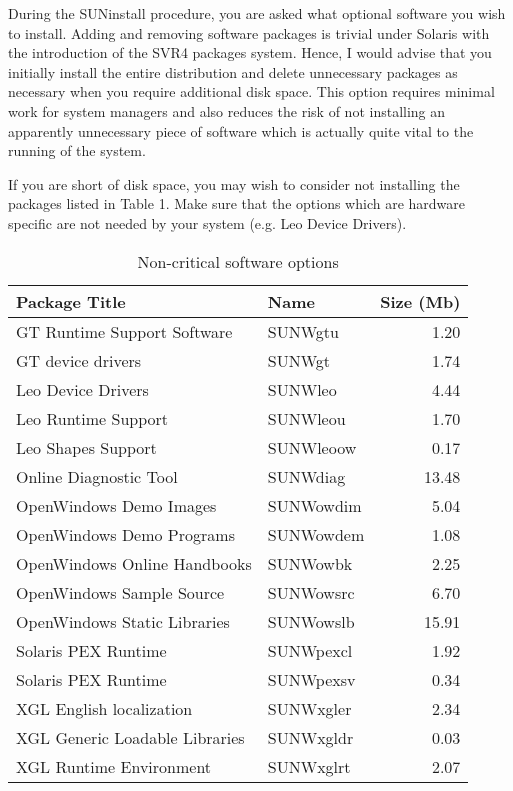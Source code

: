 During the SUNinstall procedure, you are asked what optional software you
wish to install. Adding and removing software packages is trivial
under Solaris with the introduction of the SVR4 packages system. Hence,
I would advise that you initially install the entire distribution and
delete unnecessary packages as necessary when you require additional
disk space. This option requires minimal work for system managers and also
reduces the risk of not installing an apparently unnecessary piece of software
which is actually quite vital to the running of the system.

If you are short of disk space, you may wish to consider not installing the
packages listed in Table 1. Make sure that the options which are hardware specific
are not needed by your system (e.g. Leo Device Drivers).

\begin{table}[htb]
\begin{center}
\begin{tabular}{||l|l|r||}
\hline

Package Title & Name & Size (Mb)\\
\hline
GT Runtime Support Software	& SUNWgtu	& 1.20  \\
GT device drivers 		& SUNWgt	& 1.74  \\
Leo Device Drivers		& SUNWleo	& 4.44  \\
Leo Runtime Support		& SUNWleou	& 1.70  \\
Leo Shapes Support		& SUNWleoow	& 0.17  \\
Online Diagnostic Tool		& SUNWdiag	& 13.48 \\
OpenWindows Demo Images		& SUNWowdim	& 5.04  \\
OpenWindows Demo Programs	& SUNWowdem	& 1.08  \\
OpenWindows Online Handbooks	& SUNWowbk	& 2.25 	\\
OpenWindows Sample Source	& SUNWowsrc	& 6.70  \\
OpenWindows Static Libraries	& SUNWowslb	& 15.91 \\
Solaris PEX Runtime		& SUNWpexcl	& 1.92  \\
Solaris PEX Runtime		& SUNWpexsv	& 0.34  \\
XGL English localization	& SUNWxgler	& 2.34  \\
XGL Generic Loadable Libraries	& SUNWxgldr	& 0.03  \\
XGL Runtime Environment		& SUNWxglrt	& 2.07  \\
\hline
\end {tabular}
\caption{Non-critical software options}
\end{center}
\end {table}

